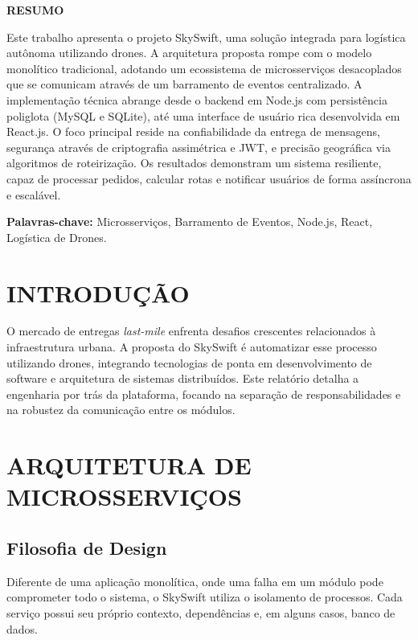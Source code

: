 \documentclass[12pt,a4paper]{article}
\begin{document}
\newpage
\begin{center}
    {\large \textbf{RESUMO}}
\end{center}
\vspace{1cm}
Este trabalho apresenta o projeto SkySwift, uma solução integrada para logística autônoma utilizando drones. A arquitetura proposta rompe com o modelo monolítico tradicional, adotando um ecossistema de microsserviços desacoplados que se comunicam através de um barramento de eventos centralizado. A implementação técnica abrange desde o backend em Node.js com persistência poliglota (MySQL e SQLite), até uma interface de usuário rica desenvolvida em React.js. O foco principal reside na confiabilidade da entrega de mensagens, segurança através de criptografia assimétrica e JWT, e precisão geográfica via algoritmos de roteirização. Os resultados demonstram um sistema resiliente, capaz de processar pedidos, calcular rotas e notificar usuários de forma assíncrona e escalável.

\textbf{Palavras-chave:} Microsserviços, Barramento de Eventos, Node.js, React, Logística de Drones.

\newpage
\tableofcontents
\newpage
\listoffigures

\newpage
\section{INTRODUÇÃO}
O mercado de entregas \textit{last-mile} enfrenta desafios crescentes relacionados à infraestrutura urbana. A proposta do SkySwift é automatizar esse processo utilizando drones, integrando tecnologias de ponta em desenvolvimento de software e arquitetura de sistemas distribuídos. Este relatório detalha a engenharia por trás da plataforma, focando na separação de responsabilidades e na robustez da comunicação entre os módulos.

\section{ARQUITETURA DE MICROSSERVIÇOS}

\subsection{Filosofia de Design}
Diferente de uma aplicação monolítica, onde uma falha em um módulo pode comprometer todo o sistema, o SkySwift utiliza o isolamento de processos. Cada serviço possui seu próprio contexto, dependências e, em alguns casos, banco de dados.
\end{document}
